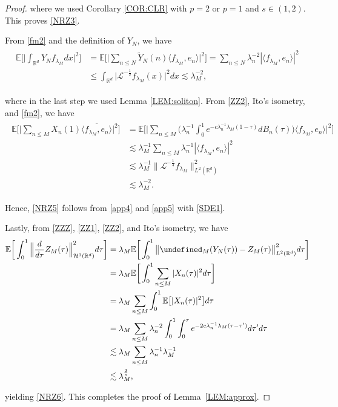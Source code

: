 \documentclass[%
11pt,  reqno]{amsart}
\theoremstyle{remarkstyle}
\newcommand{\1}{\hspace{0.2mm}\text{I}\hspace{0.2mm}}
\newcommand{\noi}{\noindent}
\newcommand{\R}{\mathbb{R}}
\let\P= \undefined
\newcommand{\P}{\mathbf{P}}
\newcommand{\E}{\mathbb{E}}
\renewcommand{\L}{\mathcal{L}}
\newcommand{\ld}{\lambda}
\newcommand{\wt}{\widetilde}
\newcommand{\cj}{\overline}
\newcommand{\les}{\lesssim}
\newcommand{\jb}[1]
{\langle #1 \rangle}
\numberwithin{equation}{section}
\numberwithin{theorem}{section}
\begin{document}
\begin{proof}
		\noi
		where we used Corollary \ref{COR:CLR} with $p =2$ or $p=1$ and $s\in (1,2)$.
		This proves \eqref{NRZ3}.
		
		
		
		
		
		
		
		
		
		
		
		From \eqref{fm2} and the definition of $Y_N$, we have
		\begin{align}
			\begin{split}
				\E\bigg[ \Big| \int_{{\R^d}} Y_N  f_{\ld_M} dx  \Big|^2\bigg]
				&= \E \bigg[ \Big| \sum_{n \le N}  \wt Y_N(n) { \jb{ f_{\ld_M}, e_n}} \Big|^2 \bigg]
				= \sum_{n \le N} \ld_n^{-2} |\jb{ f_{\ld_M}, e_n}|^2 \\
				&\le \int_{{\R^d}} \big|\L^{-\frac12} f_{\ld_M} (x)\big|^2 dx
				\les \ld_M^{-2},
			\end{split}
			\label{app4}
		\end{align}
		
		\noi
		where in the last step we used Lemma \ref{LEM:soliton}.
		From \eqref{ZZ2}, Ito's isometry, and \eqref{fm2}, we have 
		\begin{align}
			\begin{split}
				\E \bigg[ \Big| \sum_{n \le M} X_n(1) \cj{ \jb{ f_{\ld_M}, e_n} } \Big|^2 \bigg]
				&=\E \Bigg[ \bigg|\sum_{n \le M} \bigg(\ld_n^{-1}  \int_0^1 e^{- c \ld_n^{-1} \ld_M (1-\tau) } dB_n(\tau) \bigg)  {\jb{ f_{\ld_M}, e_n}}     \bigg|^2     \Bigg]\\
				&\les \ld_M^{-1} \sum_{n \le M}  \ld_n^{-1} | \jb{ f_{\ld_M}, e_n}|^2\\
				&\les \ld_M^{-1} \|\L^{-\frac14} f_{\ld_M}\|_{L^2(\R^d)}^2\\
				& \les \ld_M^{-2} .
			\end{split}
			\label{app5}
		\end{align}
		
		
		\noi
		Hence, \eqref{NRZ5} follows
		from \eqref{app4} and \eqref{app5}
		with \eqref{SDE1}.
		
		Lastly, from \eqref{ZZZ}, \eqref{ZZ1}, \eqref{ZZ2}, and Ito's isometry, we have 
		\begin{align*}
			\E\bigg[\int_0^1 \Big\| \frac d {d\tau} Z_M(\tau) \Big\|^2_{\mathcal H^1(\R^d)}d\tau\bigg] &= \ld_M \E\bigg[\int_0^1 \big\| \P_{M}(Y_N(\tau)) - Z_M(\tau) \big\|^2_{L^2(\R^d)}d\tau\bigg] \\
			&=  \ld_M \E\bigg[ \int_0^1  \sum_{n \le M} |X_n(\tau)|^2   d\tau\bigg]\\
			&=  \ld_M \sum_{n \le M} \int_0^1\E\big[|X_n(\tau)|^2\big] d\tau \\
			&= \ld_M \sum_{n \le M} \ld_n^{-2} \int_0^1 \int_0^\tau e^{-2 c \ld_n^{-1} \ld_M  (\tau-\tau')} d \tau' d\tau \\
			& \les \ld_M \sum_{n \le M } \ld_n^{-1} \ld_M^{-1} \\
			&\les  \ld_M^{\frac{2}s }, 
		\end{align*}
		
		
		\noi
		yielding  \eqref{NRZ6}.
		This completes the proof of Lemma~\ref{LEM:approx}.
	\end{proof}	
	
\end{document}
